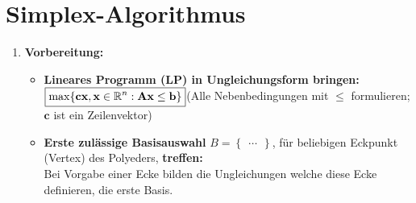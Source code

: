 \section{Simplex-Algorithmus}

\begin{enumerate}
\item \textbf{Vorbereitung:}
	\begin{itemize}
	\item \textbf{Lineares Programm (LP) in Ungleichungsform bringen:}\\
	$\boxed{\max\{\mathbf{c} \mathbf{x}, \mathbf{x}\in\mathbb{R}^n :\mathbf{Ax}\leq \mathbf{b}\}\\}$\quad(Alle Nebenbedingungen mit $\leq$ formulieren; $\mathbf{c}$ ist ein Zeilenvektor)
	\item \textbf{Erste zulässige Basisauswahl} $B=\begin{Bmatrix}\ldots\end{Bmatrix}$, für beliebigen Eckpunkt (Vertex) des Polyeders, \textbf{treffen:}\\
	Bei Vorgabe einer Ecke bilden die Ungleichungen welche diese Ecke definieren, die erste Basis.
	\end{itemize}
	
	\vspace{0.3cm}
	

\end{enumerate}
